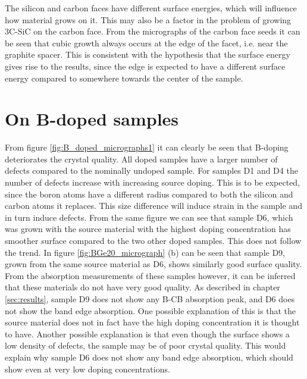 The silicon and carbon faces have different surface energies, which will influence how material grows on it. This may also be a factor in the problem of growing 3C-SiC on the carbon face. From the micrographs of the carbon face seeds it can be seen that cubic growth always occurs at the edge of the facet, i.e. near the graphite spacer. This is consistent with the hypothesis that the surface energy gives rise to the results, since the edge is expected to have a different surface energy compared to somewhere towards the center of the sample. 


\section{On B-doped samples}
From figure \ref{fig:B_doped_micrographs1} it can clearly be seen that B-doping deteriorates the crystal quality. All doped samples have a larger number of defects compared to the nominally undoped sample. For samples D1 and D4 the number of defects increase with increasing source doping. This is to be expected, since the boron atoms have a different radius compared to both the silicon and carbon atoms it replaces. This size difference will induce strain in the sample and in turn induce defects. From the same figure we can see that sample D6, which was grown with the source material with the highest doping concentration has smoother surface compared to the two other doped samples. This does not follow the trend. In figure \ref{fig:BGe20_micrograph} (b) can be seen that sample D9, grown from the same source material as D6, shows similarly good surface quality. From the absorption measurements of these samples however, it can be inferred that these materials do not have very good quality. As described in chapter \ref{sec:results}, sample D9 does not show any B-CB absorption peak, and D6 does not show the band edge absorption. One possible explanation of this is that the source material does not in fact have the high doping concentration it is thought to have. Another possible explanation is that even though the surface shows a low density of defects, the sample may be of poor crystal quality. This would explain why sample D6 does not show any band edge absorption, which should show even at very low doping concentrations. 

